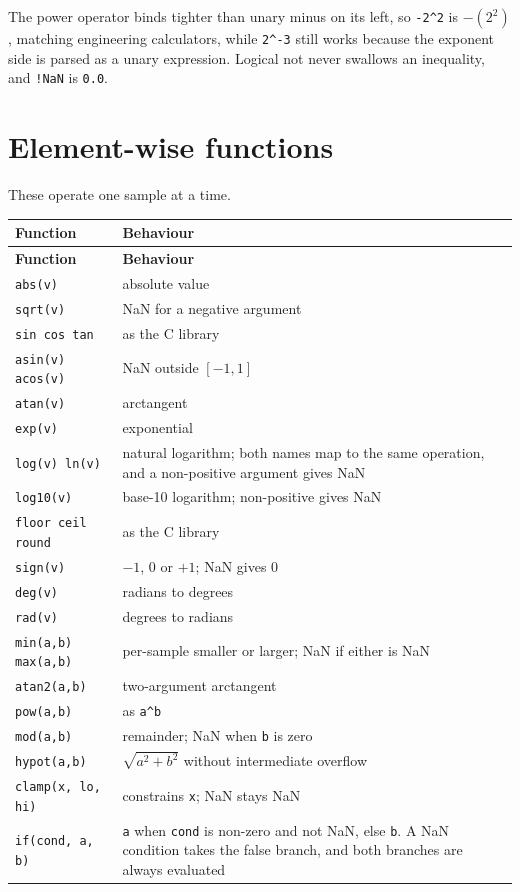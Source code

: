 \documentclass[11pt,a4paper,oneside]{report}
\newcommand{\code}[1]{\texttt{#1}}
\begin{document}
The power operator binds tighter than unary minus on its left, so
\code{-2\textasciicircum2} is $-(2^2)$, matching engineering calculators, while
\code{2\textasciicircum-3} still works because the exponent side is parsed as a
unary expression. Logical not never swallows an inequality, and \code{!NaN} is
\code{0.0}.

\section{Element-wise functions}

These operate one sample at a time.

\begin{center}
\small
\begin{longtable}{@{}p{}p{}@{}}
\toprule
\textbf{Function} & \textbf{Behaviour} \\
\midrule
\endfirsthead
\toprule
\textbf{Function} & \textbf{Behaviour} \\
\midrule
\endhead
\code{abs(v)} & absolute value \\
\code{sqrt(v)} & NaN for a negative argument \\
\code{sin cos tan} & as the C library \\
\code{asin(v) acos(v)} & NaN outside $[-1, 1]$ \\
\code{atan(v)} & arctangent \\
\code{exp(v)} & exponential \\
\code{log(v) ln(v)} & natural logarithm; both names map to the same operation, and a non-positive argument gives NaN \\
\code{log10(v)} & base-10 logarithm; non-positive gives NaN \\
\code{floor ceil round} & as the C library \\
\code{sign(v)} & $-1$, 0 or $+1$; NaN gives 0 \\
\code{deg(v)} & radians to degrees \\
\code{rad(v)} & degrees to radians \\
\code{min(a,b) max(a,b)} & per-sample smaller or larger; NaN if either is NaN \\
\code{atan2(a,b)} & two-argument arctangent \\
\code{pow(a,b)} & as \code{a\textasciicircum b} \\
\code{mod(a,b)} & remainder; NaN when \code{b} is zero \\
\code{hypot(a,b)} & $\sqrt{a^2 + b^2}$ without intermediate overflow \\
\code{clamp(x, lo, hi)} & constrains \code{x}; NaN stays NaN \\
\code{if(cond, a, b)} & \code{a} when \code{cond} is non-zero and not NaN, else \code{b}. A NaN condition takes the false branch, and both branches are always evaluated \\
\bottomrule
\end{longtable}
\end{center}
\end{document}
